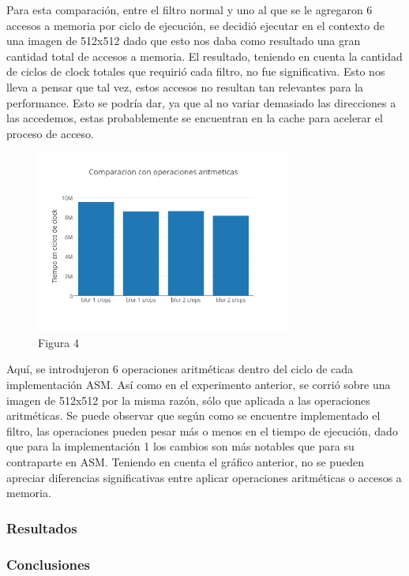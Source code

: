 \documentclass[a4paper]{article}
\begin{document}
Para esta comparación, entre el filtro normal y uno al que se le agregaron 6 accesos a memoria por ciclo de ejecución, se decidió ejecutar en el contexto de una imagen de 512x512 dado que esto nos daba como resultado una gran cantidad total de accesos a memoria. El resultado, teniendo en cuenta la cantidad de ciclos de clock totales que requirió cada filtro, no fue significativa. Esto nos lleva a pensar que tal vez, estos accesos no resultan tan relevantes para la performance. Esto se podría dar, ya que al no variar demasiado las direcciones a las accedemos, estas probablemente se encuentran en la cache para acelerar el proceso de acceso. 

\begin{figure}[h]
  \centering
    \includegraphics[width=0.75\textwidth]{imagenes/ComparacionConOperacionesAritmeticasBlurColores.png}
  \caption{Figura 4}
  \label{fig:graficoblur4}
\end{figure}
 \FloatBarrier

Aquí, se introdujeron 6 operaciones aritméticas dentro del ciclo de cada implementación ASM. Así como en el experimento anterior, se corrió sobre una imagen de 512x512 por la misma razón, sólo que aplicada a las operaciones aritméticas. Se puede observar que según como se encuentre implementado el filtro, las operaciones pueden pesar más o menos en el tiempo de ejecución, dado que para la implementación 1 los cambios son más notables que para su contraparte en ASM. Teniendo en cuenta el gráfico anterior, no se pueden apreciar diferencias significativas entre aplicar operaciones aritméticas o accesos a memoria.

\subsubsection{Resultados}


\subsubsection{Conclusiones}
\end{document}
